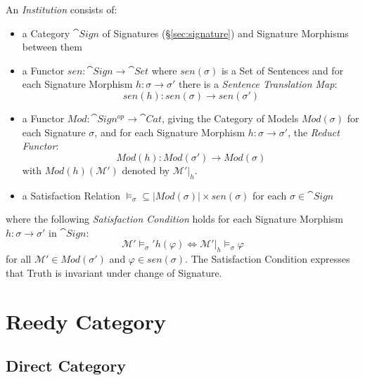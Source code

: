 An \emph{Institution} consists of:

\begin{itemize}
\item a Category $\cat{Sign}$ of Signatures (\S\ref{sec:signature})
  and Signature Morphisms between them
\item a Functor $sen : \cat{Sign} \rightarrow \cat{Set}$ where
  $sen(\sigma)$ is a Set of Sentences and for each Signature Morphism
  $h : \sigma \rightarrow \sigma'$ there is a \emph{Sentence
  Translation Map}:
  \[
  sen(h) : sen(\sigma) \rightarrow sen(\sigma')
  \]
\item a Functor $Mod : \cat{Sign^{op}} \rightarrow \cat{Cat}$,
  giving the Category of Models $Mod (\sigma)$ for each Signature
  $\sigma$, and for each Signature Morphism $h : \sigma \rightarrow
  \sigma'$, the \emph{Reduct Functor}:
  \[
  Mod(h) : Mod(\sigma') \rightarrow Mod(\sigma)
  \]
  with $Mod(h)(\mathcal{M}')$ denoted by $\mathcal{M}'|_h$.
\item a Satisfaction Relation $\models_\sigma \subseteq |Mod(\sigma)|
  \times sen(\sigma)$ for each $\sigma \in \cat{Sign}$
\end{itemize}
where the following \emph{Satisfaction Condition} holds for each
Signature Morphism $h : \sigma \rightarrow \sigma'$ in
$\cat{Sign}$:
\[
  \mathcal{M}' \models_\sigma' h(\varphi) \Leftrightarrow
  \mathcal{M}'|_h \models_\sigma \varphi
\]
for all $\mathcal{M}' \in Mod(\sigma')$ and $\varphi \in sen(\sigma)$.
The Satisfaction Condition expresses that Truth is invariant under
change of Signature.



\section{Reedy Category}\label{sec:reedy_category}




\subsection{Direct Category}\label{sec:direct_category}

